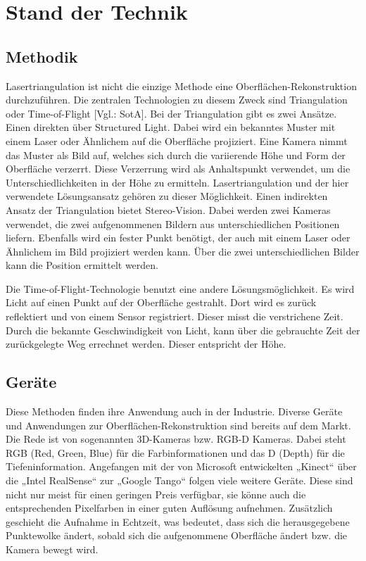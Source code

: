 \section{Stand der Technik}\label{stand-der-technik}
	\subsection{Methodik}
	Lasertriangulation ist nicht die einzige Methode eine Oberflächen-Rekonstruktion durchzuführen. Die zentralen Technologien zu diesem Zweck sind Triangulation oder Time-of-Flight [Vgl.: SotA]. 
	Bei der Triangulation gibt es zwei Ansätze. Einen direkten über Structured Light. Dabei wird ein bekanntes Muster mit einem Laser oder Ähnlichem auf die Oberfläche projiziert. Eine Kamera nimmt das Muster als Bild auf, welches sich durch die variierende Höhe und Form der Oberfläche verzerrt. Diese Verzerrung wird als Anhaltspunkt verwendet, um die Unterschiedlichkeiten in der Höhe zu ermitteln. Lasertriangulation und der hier verwendete Lösungsansatz gehören zu dieser Möglichkeit. 
	Einen indirekten Ansatz der Triangulation bietet Stereo-Vision. Dabei werden zwei Kameras verwendet, die zwei aufgenommenen Bildern aus unterschiedlichen Positionen liefern. Ebenfalls wird ein fester Punkt benötigt, der auch mit einem Laser oder Ähnlichem im Bild projiziert werden kann. Über die zwei unterschiedlichen Bilder kann die Position ermittelt werden.
	
	Die Time-of-Flight-Technologie benutzt eine andere Lösungsmöglichkeit. Es wird Licht auf einen Punkt auf der Oberfläche gestrahlt. Dort wird es zurück reflektiert und von einem Sensor registriert. Dieser misst die verstrichene Zeit. Durch die bekannte Geschwindigkeit von Licht, kann über die gebrauchte Zeit der zurückgelegte Weg errechnet werden. Dieser entspricht der Höhe.

	\subsection{Geräte}
	Diese Methoden finden ihre Anwendung auch in der Industrie. Diverse Geräte und Anwendungen zur Oberflächen-Rekonstruktion sind bereits auf dem Markt. Die Rede ist von sogenannten 3D-Kameras bzw. RGB-D Kameras. Dabei steht RGB (Red, Green, Blue) für die Farbinformationen und das D (Depth) für die Tiefeninformation. Angefangen mit der von Microsoft entwickelten „Kinect“ über die „Intel RealSense“ zur „Google Tango“ folgen viele weitere Geräte. Diese sind nicht nur meist für einen geringen Preis verfügbar, sie könne auch die entsprechenden Pixelfarben in einer guten Auflösung aufnehmen. Zusätzlich geschieht die Aufnahme in Echtzeit, was bedeutet, dass sich die herausgegebene Punktewolke ändert, sobald sich die aufgenommene Oberfläche ändert bzw. die Kamera bewegt wird.
